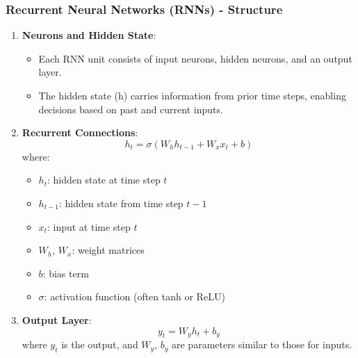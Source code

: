\documentclass{beamer}
\begin{document}
\begin{frame}[fragile]
    \frametitle{Recurrent Neural Networks (RNNs) - Structure}
    \begin{enumerate}
        \item \textbf{Neurons and Hidden State}:
        \begin{itemize}
            \item Each RNN unit consists of input neurons, hidden neurons, and an output layer.
            \item The hidden state (h) carries information from prior time steps, enabling decisions based on past and current inputs.
        \end{itemize}
        
        \item \textbf{Recurrent Connections}:
        \begin{equation}
            h_t = \sigma(W_h h_{t-1} + W_x x_t + b)
        \end{equation}
        where:
        \begin{itemize}
            \item $h_t$: hidden state at time step $t$
            \item $h_{t-1}$: hidden state from time step $t-1$
            \item $x_t$: input at time step $t$
            \item $W_h$, $W_x$: weight matrices
            \item $b$: bias term
            \item $\sigma$: activation function (often tanh or ReLU)
        \end{itemize}
        
        \item \textbf{Output Layer}:
        \begin{equation}
            y_t = W_y h_t + b_y
        \end{equation}
        where $y_t$ is the output, and $W_y$, $b_y$ are parameters similar to those for inputs.
    \end{enumerate}
\end{frame}
\end{document}
